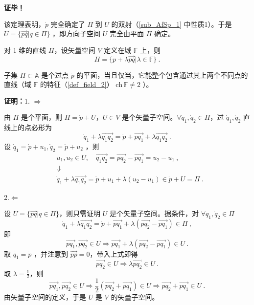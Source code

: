 \textbf{证毕！}

该定理表明，$\dot p$ 完全确定了 $\Pi$ 到 $U$ 的双射（\autoref{sub_AfSp_1}  中性质1）。于是 $U=\{\overrightarrow{pq}|q\in \Pi\}$ ，即方向子空间 $U$ 完全由平面 $\Pi$ 确定。

对 1 维的直线 $\Pi$，设矢量空间 $V$ 定义在域 $\mathbb F$ 上，则
\begin{equation}\label{eq_SAfSp_4}
\Pi=\{\dot p+\lambda\overrightarrow{pq}|\lambda\in \mathbb F\}~.
\end{equation}
\begin{theorem}{}
子集 $\Pi \subset\mathbb A$ 是个过点 $\dot p$ 的平面，当且仅当，它能整个包含通过其上两个不同点的直线（域 $\mathbb F$ 的特征（\autoref{def_field_2}） $\mathrm{ch}\,\mathbb F\neq 2$ ）。
\end{theorem}
\textbf{证明：}1.
$\Rightarrow$

由 $\Pi$ 是个平面，则 $\Pi=\dot p+U$，$U\in V$ 是个矢量子空间。$\forall\dot q_1,\dot q_2\in \Pi$，过 $\dot q_1,\dot q_2$ 直线上的点必形为
\begin{equation}
\dot q_1+\lambda\overrightarrow{q_1q_2}=\dot p+\overrightarrow{pq_1}+\lambda\overrightarrow{q_1q_2}~.
\end{equation}
设 $\dot q_1=\dot p+u_1,\dot q_2=\dot p+u_2$ ，则
\begin{equation}
\begin{aligned}
&u_1,u_2\in U,\quad \overrightarrow{q_1q_2}=\overrightarrow{pq_2}-\overrightarrow{pq_1}=u_2-u_1~,\\
&\Downarrow\\
&\dot q_1+\lambda\overrightarrow{q_1q_2}=\dot p+u_1+\lambda(u_2-u_1)\in\dot p+U=\Pi~.
\end{aligned}
\end{equation}

2.$\Leftarrow$

设 $U=\{\overrightarrow{pq}|\dot q\in \Pi\}$，则只需证明 $U$ 是个矢量子空间。据条件，对 $\forall \dot q_1,\dot q_2\in\Pi$
\begin{equation}
\dot q_1+\lambda\overrightarrow{q_1q_2}=\dot p+\overrightarrow{pq_1}+\lambda(\overrightarrow{pq_2}-\overrightarrow{pq_1})\in\Pi~,
\end{equation}
 即
 \begin{equation}
 \overrightarrow{pq_1},\overrightarrow{pq_2}\in U\Rightarrow \overrightarrow{pq_1}+\lambda(\overrightarrow{pq_2}-\overrightarrow{pq_1})\in U~.
 \end{equation}
 取 $\dot{q_1}=\dot{p}$ ，并注意到 $\overrightarrow{pp}=0$，带入上式即得 
 \begin{equation}\label{eq_SAfSp_2}
 \overrightarrow{pq_2}\in U\Rightarrow\lambda\overrightarrow{pq_2}\in U ~.
 \end{equation}
取 $\lambda=\frac{1}{2}$，则 
\begin{equation}
\overrightarrow{pq_1},\overrightarrow{pq_2}\in U\Rightarrow \frac{1}{2}(\overrightarrow{pq_2}+\overrightarrow{pq_1})\in U\Rightarrow \overrightarrow{pq_2}+\overrightarrow{pq_1}\in U~.
\end{equation}
由矢量子空间的定义，于是 $U$ 是 $V$ 的矢量子空间。

